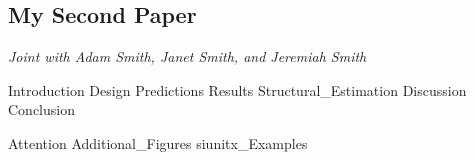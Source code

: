 \documentclass[11pt, a4paper, twoside]{book}
\begin{document}
\begin{refsection}

\makeatletter
\renewcommand{\@makefntext}[1]{\@makefntextorig{#1}}
\makeatother
\chapter
	[My Second Paper]
	{My Second Paper%
	 \setcounter{footnote}{1}\textsuperscript{\Large{}}%
	}
\label{diss:MySecondPaper}
\renewcommand{\thefootnote}{\fnsymbol{footnote}}
\footnotetext[1]{\:\protect}
\renewcommand{\thefootnote}{\thefootnoteorig}
\makeatletter
\renewcommand{\@makefntext}[1]{\@makefntextcustom{#1}}
\renewcommand{\@makefnmark}{\@makefnmarkorig}
\makeatother
\setcounter{footnote}{0}
\vspace{-\bigskipamount}\textsf{\textit{Joint with Adam Smith, Janet Smith, and Jeremiah Smith}} \bigskip

\graphicspath{{1_Example_Content/}}
{Introduction}
{Design}
{Predictions}
{Results}
{Structural_Estimation}
{Discussion}
{Conclusion}

\begin{subappendices}
	\label{sec:appendix}
	\FloatBarrier
	{Attention}
	\FloatBarrier
	\newpage
	{Additional_Figures}
	\FloatBarrier
	{siunitx_Examples}
	\clearpage
\end{subappendices}

\begin{refcontext}[sorting=nyt]
	\printbibliography[heading=subbibliography]
\end{refcontext}

\end{refsection}


\end{document}
